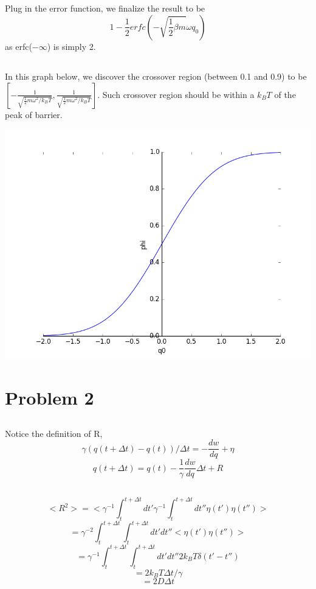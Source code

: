 \documentclass[11pt, oneside]{article}   	%
\begin{document}
\subsection{}
Plug in the error function, we finalize the result to be $$1-\frac{1}{2}erfc(-\sqrt{\frac{1}{2}\beta m}\omega q_0)$$ as erfc($-\infty$) is simply 2.
\subsection{}
In this graph below, we discover the crossover region (between 0.1 and 0.9) to be $[-\frac{1}{\sqrt{\frac{1}{2}m\omega^{2}/k_B T}}, \frac{1}{\sqrt{\frac{1}{2}m\omega^{2}/k_B T}}]$. Such crossover region should be within a $k_B T$ of the peak of barrier.

\includegraphics[scale = 0.5]{error function.png}

\section{Problem 2}
\subsection{}
Notice the definition of R, $$\gamma (q(t+\Delta t)-q(t))/\Delta t = -\frac{dw}{dq}+\eta$$
$$ q(t+\Delta t) = q(t) - \frac{1}{\gamma} \frac{dw}{dq} \Delta t + R$$

\subsection{}
$$<R^2> = <\gamma^{-1} \int_{t}^{t+\Delta t} dt' \gamma^{-1} \int_{t}^{t+\Delta t} dt'' \eta (t') \eta (t'')>$$
$$   = \gamma^{-2} \int_{t}^{t+\Delta t} \int_{t}^{t+\Delta t} dt'dt'' <\eta (t') \eta (t'')>$$
$$   = \gamma^{-1} \int_{t}^{t+\Delta t} \int_{t}^{t+\Delta t} dt'dt'' 2k_B T\delta (t'-t'')$$
$$   = 2k_B T\Delta t /\gamma$$
$$   = 2D\Delta t$$
\end{document}
